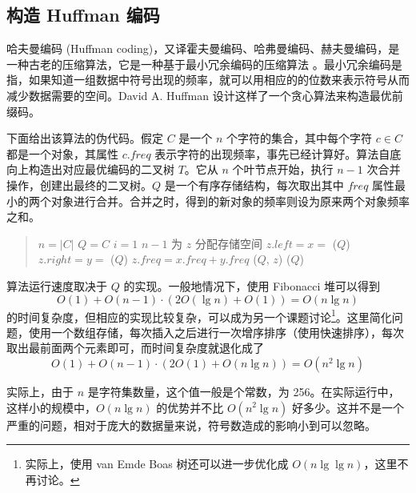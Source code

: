 \subsection{构造 Huffman 编码}

哈夫曼编码 (Huffman coding)，又译霍夫曼编码、哈弗曼编码、赫夫曼编码，是一种古老的压缩算法，它是一种基于最小冗余编码的压缩算法 \cite{maic}。最小冗余编码是指，如果知道一组数据中符号出现的频率，就可以用相应的的位数来表示符号从而减少数据需要的空间。David A. Huffman \cite{huffman} 设计这样了一个贪心算法来构造最优前缀码。

下面给出该算法的伪代码。假定 $C$ 是一个 $n$ 个字符的集合，其中每个字符 $c\in C$ 都是一个对象，其属性 $c.freq$ 表示字符的出现频率，事先已经计算好。算法自底向上构造出对应最优编码的二叉树 $T$。它从 $n$ 个叶节点开始，执行 $n-1$ 次合并操作，创建出最终的二叉树。$Q$ 是一个有序存储结构，每次取出其中 $freq$ 属性最小的两个对象进行合并。合并之时，得到的新对象的频率则设为原来两个对象频率之和。

\begin{quote}
\begin{codebox}
\li $n = |C|$
\li $Q = C$
\li \For $i = 1$ \To $n-1$ \Do
\li   为 $z$ 分配存储空间
\li   $z.left = x = $ ($Q$)
\li   $z.right = y = $ ($Q$)
\li   $z.freq = x.freq + y.freq$
\li   {}($Q$, $z$)
    \End
\li \Return {}($Q$)
\label{Huffman-pc}
\end{codebox}
\end{quote}

算法运行速度取决于 $Q$ 的实现。一般地情况下，使用 Fibonacci 堆可以得到
\[ O(1) + O(n-1)\cdot (2O(\lg n) + O(1)) = O(n\lg n)\]
的时间复杂度，但相应的实现比较复杂，可以成为另一个课题讨论\footnote{实际上，使用 van Emde Boas 树还可以进一步优化成 $O(n\lg\lg n)$，这里不再讨论。}。这里简化问题，使用一个数组存储，每次插入之后进行一次增序排序（使用快速排序），每次取出最前面两个元素即可，而时间复杂度就退化成了
\[ O(1) + O(n-1)\cdot (2O(1) + O(n\lg n)) = O(n^2\lg n)\]

实际上，由于 $n$ 是字符集数量，这个值一般是个常数，为 256。在实际运行中，这样小的规模中，$O(n\lg n)$ 的优势并不比 $O(n^2\lg n)$ 好多少。这并不是一个严重的问题，相对于庞大的数据量来说，符号数造成的影响小到可以忽略。

